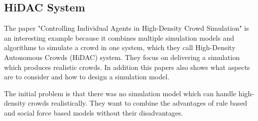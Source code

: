 \documentclass{acmsiggraph}               %
\begin{document}
\subsection{HiDAC System}

The paper "Controlling Individual Agents in High-Density Crowd Simulation" \cite{pelechano_controlling_2007} is an interesting example because it combines multiple simulation models and algorithms to simulate a crowd in one system, which they call High-Density Autonomous Crowds (HiDAC) system. They focus on delivering a simulation which produces realistic crowds.
In addition this papers also shows what aspects are to consider and how to design a simulation model.

The initial problem is that there was no simulation model which can handle high-density crowds realistically. They want to combine the advantages of rule based and social force based models without their disadvantages.
\end{document}
